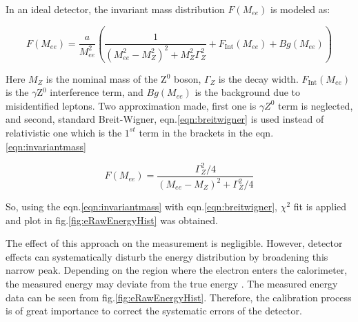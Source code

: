 In an ideal detector, the invariant mass distribution $F(M_{ee})$ is modeled as:

\begin{equation}
	F(M_{ee}) = \frac{a}{M_{ee}^2} \left( \frac{1}{(M_{ee}^2 - M_Z^2)^2 + M_Z^2 \Gamma_Z^2} + F_{\text{Int}}(M_{ee}) + Bg(M_{ee}) \right)
	\label{eqn:invariantmass}
\end{equation}


Here $M_Z$ is the nominal mass of the Z$^0$ boson, $\Gamma_Z$ is the decay width. $F_{\text{Int}}(M_{ee})$ is the $\gamma$Z$^0$ interference term, and $Bg(M_{ee})$ is the background due to misidentified leptons\cite{atlaslabmanual}. Two approximation made, first one is $\gamma Z^0$ term is neglected, and second, standard Breit-Wigner, eqn.\ref{eqn:breitwigner} is used instead of relativistic one which is the $1^{st}$ term in the brackets in the eqn.\ref{eqn:invariantmass}

\begin{equation}
	F(M_{ee}) = \frac{\Gamma_Z^2 / 4}{(M_{ee} - M_Z)^2 + \Gamma_Z^2 / 4}
	\label{eqn:breitwigner}
\end{equation}

So, using the eqn.\ref{eqn:invariantmass} with eqn.\ref{eqn:breitwigner}, $\chi^2$ fit is applied and plot in fig.\ref{fig:eRawEnergyHist} was obtained.

The effect of this approach on the measurement is negligible. However, detector effects can systematically disturb the energy distribution by broadening this narrow peak. Depending on the region where the electron enters the calorimeter, the measured energy may deviate from the true energy \cite{atlaslabmanual}. The measured energy data can be seen from fig.\ref{fig:eRawEnergyHist}. Therefore, the calibration process is of great importance to correct the systematic errors of the detector.

